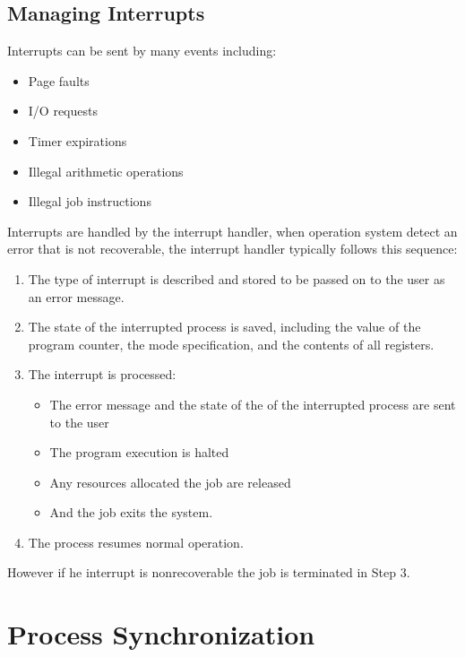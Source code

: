 \documentclass[12pt letter]{report}
\begin{document}
\section{Managing Interrupts}


Interrupts can be sent by many events including:
\begin{itemize}
  \item Page faults
  \item I/O requests
  \item Timer expirations
  \item Illegal arithmetic operations
  \item Illegal job instructions
\end{itemize}

Interrupts are handled by the interrupt handler, when operation
system detect an error that is not recoverable, the interrupt handler
typically follows this sequence:
\begin{enumerate}
  \item The type of interrupt is described and stored to be passed on
    to the user as an error message.
  \item The state of the interrupted process is saved, including the
    value of the program counter, the mode specification, and the
    contents of all registers.
  \item  The interrupt is processed:
    \begin{itemize}
      \item The error message and the state of the of the interrupted
        process are sent to the user
      \item The program execution is halted
      \item Any resources allocated the job are released
      \item And the job exits the system.
    \end{itemize}
  \item The process resumes normal operation.
\end{enumerate}

However if he interrupt is nonrecoverable the job is terminated in Step 3.

\chapter{Process Synchronization}
\end{document}
